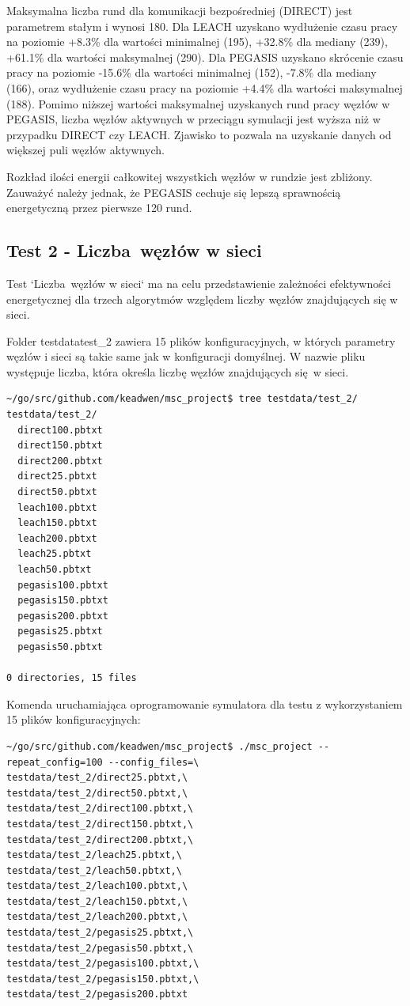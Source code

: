 \documentclass[a4paper,12pt,twoside,openany]{report}
\begin{document}
\par
Maksymalna liczba rund dla komunikacji bezpośredniej (DIRECT) jest parametrem stałym i wynosi 180.
Dla LEACH uzyskano wydłużenie czasu pracy na poziomie +8.3\% dla wartości minimalnej (195), +32.8\% dla mediany (239), +61.1\% dla wartości maksymalnej (290).
Dla PEGASIS uzyskano skrócenie czasu pracy na poziomie -15.6\% dla wartości minimalnej (152), -7.8\% dla mediany (166), oraz wydłużenie czasu pracy na poziomie +4.4\% dla wartości maksymalnej (188).
Pomimo niższej wartości maksymalnej uzyskanych rund pracy węzłów w PEGASIS, liczba węzłów aktywnych w przeciągu symulacji jest wyższa niż w przypadku DIRECT czy LEACH.
Zjawisko to pozwala na uzyskanie danych od większej puli węzłów aktywnych.
\par
Rozkład ilości energii całkowitej wszystkich węzłów w rundzie jest zbliżony.
Zauważyć należy jednak, że PEGASIS cechuje się lepszą sprawnością energetyczną przez pierwsze 120 rund.

\subsection{Test 2 - Liczba węzłów w sieci}

Test `Liczba węzłów w sieci` ma na celu przedstawienie zależności efektywności energetycznej dla trzech algorytmów względem liczby węzłów znajdujących się w sieci.

Folder testdata\/test\_2 zawiera 15 plików konfiguracyjnych, w których parametry węzłów i sieci są takie same jak w konfiguracji domyślnej.
W nazwie pliku występuje liczba, która określa liczbę węzłów znajdujących się w sieci.

\begin{lstlisting}
~/go/src/github.com/keadwen/msc_project$ tree testdata/test_2/
testdata/test_2/
  direct100.pbtxt
  direct150.pbtxt
  direct200.pbtxt
  direct25.pbtxt
  direct50.pbtxt
  leach100.pbtxt
  leach150.pbtxt
  leach200.pbtxt
  leach25.pbtxt
  leach50.pbtxt
  pegasis100.pbtxt
  pegasis150.pbtxt
  pegasis200.pbtxt
  pegasis25.pbtxt
  pegasis50.pbtxt

0 directories, 15 files
\end{lstlisting}

Komenda uruchamiająca oprogramowanie symulatora dla testu z wykorzystaniem 15 plików konfiguracyjnych:

\begin{lstlisting}
~/go/src/github.com/keadwen/msc_project$ ./msc_project --repeat_config=100 --config_files=\
testdata/test_2/direct25.pbtxt,\
testdata/test_2/direct50.pbtxt,\
testdata/test_2/direct100.pbtxt,\
testdata/test_2/direct150.pbtxt,\
testdata/test_2/direct200.pbtxt,\
testdata/test_2/leach25.pbtxt,\
testdata/test_2/leach50.pbtxt,\
testdata/test_2/leach100.pbtxt,\
testdata/test_2/leach150.pbtxt,\
testdata/test_2/leach200.pbtxt,\
testdata/test_2/pegasis25.pbtxt,\
testdata/test_2/pegasis50.pbtxt,\
testdata/test_2/pegasis100.pbtxt,\
testdata/test_2/pegasis150.pbtxt,\
testdata/test_2/pegasis200.pbtxt
\end{lstlisting}
\end{document}
